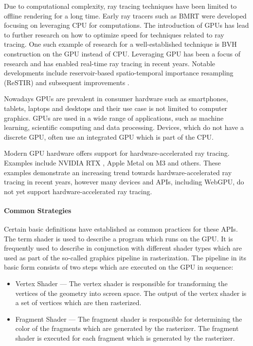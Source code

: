 Due to computational complexity, ray tracing techniques have been limited to offline rendering for a long time. Early ray tracers such as \gls{BMRT} were developed focusing on leveraging \gls{CPU} for computations. The introduction of \glspl{GPU} has lead to further research on how to optimize speed for techniques related to ray tracing. One such example of research for a well-established technique is \gls{BVH} construction on the \gls{GPU} \cite{lauterbach2009GPUbvh} instead of \gls{CPU}. Leveraging \gls{GPU} has been a focus of research and has enabled real-time ray tracing in recent years. Notable developments include reservoir-based spatio-temporal importance resampling (ReSTIR) \cite{restir} and subsequent improvements \cite{restirAdvancements,restirGeneralized}.

Nowadays GPUs are prevalent in consumer hardware such as smartphones, tablets, laptops and desktops and their use case is not limited to computer graphics. GPUs are used in a wide range of applications, such as machine learning, scientific computing and data processing. Devices, which do not have a discrete GPU, often use an integrated GPU which is part of the CPU.

Modern GPU hardware offers support for hardware-accelerated ray tracing. Examples include NVIDIA RTX \cite{nvidiaRtxRayTracing}, Apple Metal on M3 \cite{appleM3GpuAdvancements} and others. These examples demonstrate an increasing trend towards hardware-accelerated ray tracing in recent years, however many devices and \glspl{API}, including WebGPU, do not yet support hardware-accelerated ray tracing.

\paragraph{Common Strategies}
\label{sec:commonGpuStrategies}

Certain basic definitions have established as common practices for these \glspl{API}. The term shader is used to describe a program which runs on the \gls{GPU}. It is frequently used to describe in conjunction with different shader types which are used as part of the so-called graphics pipeline in rasterization. The pipeline in its basic form consists of two steps which are executed on the \gls{GPU} in sequence:

\begin{itemize}
    \item{Vertex Shader} — The vertex shader is responsible for transforming the vertices of the geometry into screen space. The output of the vertex shader is a set of vertices which are then rasterized.
    \item{Fragment Shader} — The fragment shader is responsible for determining the color of the fragments which are generated by the rasterizer. The fragment shader is executed for each fragment which is generated by the rasterizer.
\end{itemize}

